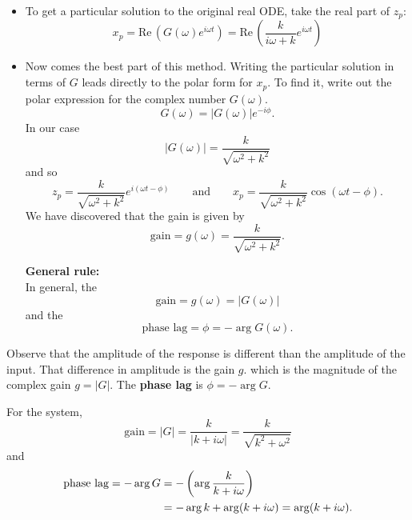 \begin{itemize}
\item To get a particular solution to the original real ODE, take the real part of $z_ p$:
  \begin{equation*}
    x_ p = \mathrm{Re\, }\left( G(\omega ) e^{i\omega t}\right)
    = \mathrm{Re\, }\left( \frac{k}{i\omega + k}e^{i\omega t} \right)
  \end{equation*}
\item Now comes the best part of this method.
  Writing the particular solution in terms of $G$ leads directly to the polar form for $x_ p$.
  To find it, write out the polar expression for the complex number $G(\omega)$.
  \begin{equation*}
    G(\omega ) = \left| G(\omega ) \right|e^{-i\phi }.
  \end{equation*}
  In our case
  \begin{equation*}
    \left| G(\omega ) \right| = \frac{k}{\sqrt {\omega ^2+k^2}}
  \end{equation*}
  and so
  \begin{equation*}
    \displaystyle  z_ p \displaystyle =
    \displaystyle \frac{k}{\sqrt {\omega ^2+k^2}}e^{i(\omega t-\phi )}
    \qquad \text {and}
    \qquad x_ p \displaystyle  = \displaystyle \frac{k}{\sqrt {\omega ^2+k^2}}\cos (\omega t-\phi ).    
  \end{equation*}
  We have discovered that the gain is given by
  \begin{equation*}
    \text {gain} = g(\omega ) = \frac{k}{\sqrt {\omega ^2+k^2}}.
  \end{equation*}

  \textbf{\color{orange}General rule:}\\
  In general, the
  \begin{equation*}
    \text {gain} = g(\omega ) = \left|G(\omega ) \right|
  \end{equation*}
  and the
  \begin{equation*}
      \text {phase lag} = \phi = -\arg G(\omega ).
  \end{equation*}

\end{itemize}
Observe that the amplitude of the response is different than the amplitude of the input.
That difference in amplitude is the gain $g$. which is the magnitude of the complex gain
$g = |G|$.
The \textbf{\color{blue}phase lag} is $\phi = -\arg {G}$.

For the system,
\begin{equation*}
  \text {gain} = |G| = \frac{k}{\left| k+i\omega \right|} = \frac{k}{\sqrt {k^2 + \omega ^2}}
\end{equation*}
and
\begin{align*}
  \displaystyle  \displaystyle \text {phase lag} = -\arg G
  \displaystyle &= \displaystyle  -\left(\arg \frac{k}{k+i\omega }\right) \\
  \displaystyle &= \displaystyle  - \arg k + \arg (k+i\omega ) = \arg (k+i\omega ).  
\end{align*}

